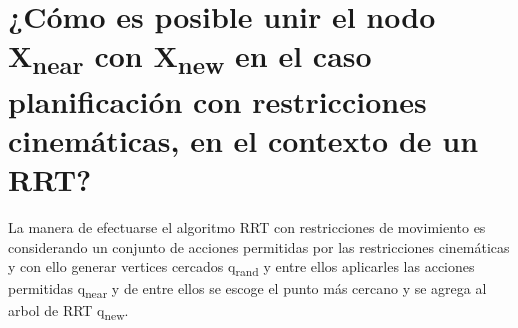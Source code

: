 \section{¿Cómo es posible unir el nodo X\textsubscript{near} con X\textsubscript{new} en el caso planificación con restricciones cinemáticas, en el contexto de un RRT?}
La manera de efectuarse el algoritmo RRT con restricciones de movimiento es considerando un conjunto de acciones permitidas por las restricciones cinemáticas y con ello generar vertices cercados q\textsubscript{rand} y entre ellos aplicarles las acciones permitidas q\textsubscript{near} y de entre ellos se escoge el punto más cercano y se agrega al arbol de RRT q\textsubscript{new}.